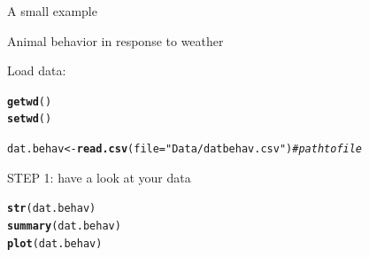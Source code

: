 \documentclass[10pt]{beamer}\usepackage[]{graphicx}\usepackage[]{color}
\makeatletter
\newcommand{\hlstr}[1]{\textcolor[rgb]{0.192,0.494,0.8}{#1}}%
\newcommand{\hlcom}[1]{\textcolor[rgb]{0.678,0.584,0.686}{\textit{#1}}}%
\newcommand{\hlstd}[1]{\textcolor[rgb]{0.345,0.345,0.345}{#1}}%
\newcommand{\hlkwb}[1]{\textcolor[rgb]{0.69,0.353,0.396}{#1}}%
\newcommand{\hlkwc}[1]{\textcolor[rgb]{0.333,0.667,0.333}{#1}}%
\newcommand{\hlkwd}[1]{\textcolor[rgb]{0.737,0.353,0.396}{\textbf{#1}}}%
\newenvironment{kframe}{%
 \def\at@end@of@kframe{}%
 \ifinner\ifhmode%
  \def\at@end@of@kframe{\end{minipage}}%
  \begin{minipage}{\columnwidth}%
 \fi\fi%
 \def\FrameCommand##1{\hskip\@totalleftmargin \hskip-\fboxsep
 \colorbox{shadecolor}{##1}\hskip-\fboxsep
     \hskip-\linewidth \hskip-\@totalleftmargin \hskip\columnwidth}%
 \MakeFramed {\advance\hsize-\width
   \@totalleftmargin\z@ \linewidth\hsize
   \@setminipage}}%
 {\par\unskip\endMakeFramed%
 \at@end@of@kframe}
\newenvironment{knitrout}{}{} %
\makeatother
\begin{document}
\begin{frame}[fragile]{A small example}

Animal behavior in response to weather



Load data:
\begin{knitrout}
\color{fgcolor}\begin{kframe}
\begin{alltt}
\hlkwd{getwd}\hlstd{()}
\hlkwd{setwd}\hlstd{()}
\end{alltt}
\end{kframe}
\end{knitrout}

\begin{knitrout}
\color{fgcolor}\begin{kframe}
\begin{alltt}
\hlstd{dat.behav} \hlkwb{<-} \hlkwd{read.csv}\hlstd{(}\hlkwc{file} \hlstd{=} \hlstr{"Data/datbehav.csv"}\hlstd{)} \hlcom{# path to file}
\end{alltt}
\end{kframe}
\end{knitrout}

\pause
STEP 1: have a look at your data
\begin{knitrout}
\color{fgcolor}\begin{kframe}
\begin{alltt}
\hlkwd{str}\hlstd{(dat.behav)}
\hlkwd{summary}\hlstd{(dat.behav)}
\hlkwd{plot}\hlstd{(dat.behav)}
\end{alltt}
\end{kframe}
\end{knitrout}
\end{frame}
\end{document}
